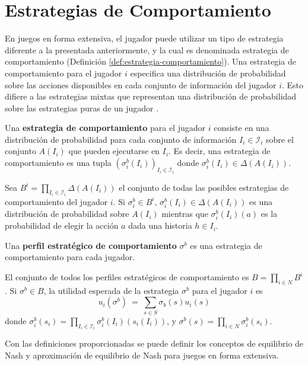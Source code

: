 \section{Estrategias de Comportamiento}

En juegos en forma extensiva, el jugador puede utilizar un tipo de estrategia diferente a la presentada anteriormente, y la cual es denominada estrategia de comportamiento (Definición \ref{def:estrategia-comportamiento}). Una estrategia de comportamiento para el jugador $i$ especifica una distribución de probabilidad sobre las acciones disponibles en cada conjunto de información del jugador $i$. Esto difiere a las estrategias mixtas que representan una distribución de probabilidad sobre las estrategias puras de un jugador \cite[p. 212]{bib:course-game-theory}. 

\begin{definition}
\label{def:estrategia-comportamiento}
Una \textbf{estrategia de comportamiento} para el jugador $i$ consiste en una distribución de probabilidad para cada conjunto de información $I_i \in \mathcal{I}_i$ sobre el conjunto $A(I_i)$ que pueden ejecutarse en $I_i$.
Es decir, una estrategia de comportamiento es una tupla $(\sigma^b_i(I_i))_{I_i \in \mathcal{I}_i}$ donde $\sigma^b_i(I_i) \in \Delta(A(I_i))$.
\end{definition}

Sea $B^i = \prod_{I_i \in \mathcal{I}_i} \Delta(A(I_i))$ el conjunto de todas las posibles estrategias de comportamiento del jugador $i$. Si $\sigma_i^b \in B^i$, $\sigma_i^b(I_i) \in \Delta(A(I_i))$ es una distribución de probabilidad sobre $A(I_i)$ mientras que $\sigma_i^b(I_i)(a)$ es la probabilidad de elegir la acción $a$ dada una historia $h \in I_i$.

\begin{definition}
Una \textbf{perfil estratégico de comportamiento} $\sigma^b$ es una estrategia de comportamiento para cada jugador.
\end{definition}

El conjunto de todos los perfiles estratégicos de comportamiento es $B = \prod_{i \in N} B^i$. Si $\sigma^b \in B$, la utilidad esperada de la estrategia $\sigma^b$ para el jugador $i$ es
\[ u_i(\sigma^b)\ =\ \sum_{s \in S} \sigma_b(s)u_i(s) \]
donde $\sigma_i^b(s_i) = \prod_{I_i \in \mathcal{I}_i} \sigma_i^b(I_i)(s_i(I_i))$, y $\sigma^b(s) =  \prod_{i \in N} \sigma_i^b(s_i)$.

Con las definiciones proporcionadas se puede definir los conceptos de equilibrio de Nash y aproximación de equilibrio de Nash para juegos en forma extensiva.

